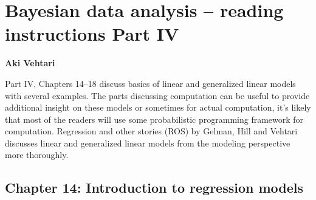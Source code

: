 \documentclass[a4paper,11pt]{article}
\begin{document}
\thispagestyle{empty}

\section*{Bayesian data analysis -- reading instructions Part IV} 
\smallskip
{\bf Aki Vehtari}
\smallskip
\bigskip

\noindent
Part IV, Chapters 14--18 discuss basics of linear and generalized
linear models with several examples. The parts discussing computation
can be useful to provide additional insight on these models or
sometimes for actual computation, it's likely that most of the readers
will use some probabilistic programming framework for
computation. Regression and other stories (ROS) by Gelman, Hill and
Vehtari discusses linear and generalized linear models from the
modeling perspective more thoroughly.

\subsection*{Chapter 14: Introduction to regression models}
\end{document}

